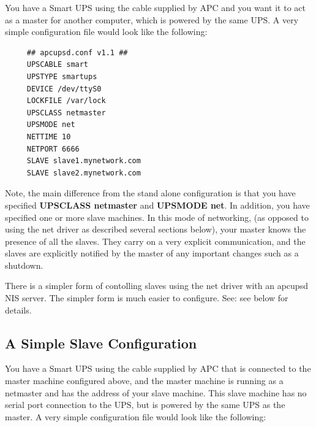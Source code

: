 \label{index-Configuration_002c-Master-74}
\label{index-Master_002c-config-example-75}
\label{index-Example_002c-Master-conf-76}
You have a Smart UPS using the cable supplied by APC and you want it to act as
a master for another computer, which is powered by the same UPS. A very simple
configuration file would look like the following: 

\footnotesize
\begin{verbatim}
     ## apcupsd.conf v1.1 ##
     UPSCABLE smart
     UPSTYPE smartups
     DEVICE /dev/ttyS0
     LOCKFILE /var/lock
     UPSCLASS netmaster
     UPSMODE net
     NETTIME 10
     NETPORT 6666
     SLAVE slave1.mynetwork.com
     SLAVE slave2.mynetwork.com
\end{verbatim}
\normalsize

Note, the main difference from the stand alone configuration is that you have
specified {\bf UPSCLASS netmaster} and {\bf UPSMODE net}.  In addition, you
have specified one or more slave machines.  In this mode of networking, (as
opposed to using the net driver as described several sections below), your
master knows the presence of all the slaves.  They carry on a very explicit
communication, and the slaves are explicitly notified by the master of any
important changes such as a shutdown.  

There is a simpler form of contolling slaves using the net driver with an
apcupsd NIS server. The simpler form is much easier to configure. See: see 
below for details. 

\label{A-Simple-Slave-Configuration}

\subsection*{A Simple Slave Configuration}

\label{index-Slave-Configuration-77}
\label{index-Configuration_002c-Slave-78}
\label{index-Example_002c-Slave-conf-79}
You have a Smart UPS using the cable supplied by APC that is connected to the
master machine configured above, and the master machine is running as a
netmaster and has the address of your slave machine.  This slave machine has
no serial port connection to the UPS, but is powered by the same UPS as the
master.  A very simple configuration file would look like the following: 

